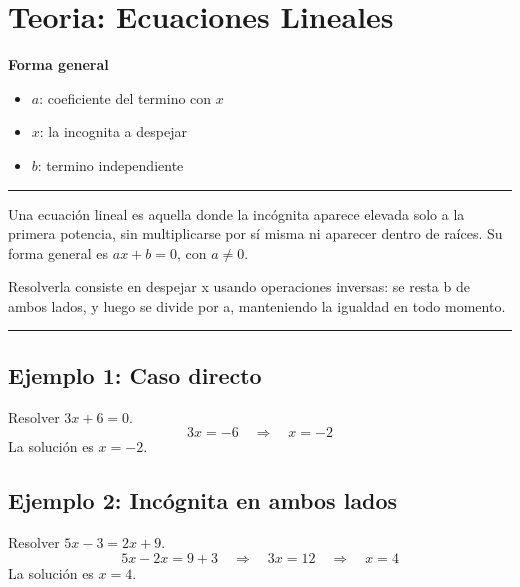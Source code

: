 \documentclass{article}
\begin{document}
\large

\section*{Teoria: Ecuaciones Lineales}

\vspace{3\baselineskip}
\begin{center}
\textbf{Forma general}

\vspace{0.8cm}
\end{center}
\vspace{0.6cm}
\begin{itemize}
\item {\Large \(a\)}: coeficiente del termino con \(x\)
\item {\Large \(x\)}: la incognita a despejar
\item {\Large \(b\)}: termino independiente
\end{itemize}
\vspace{2\baselineskip}

\hrule
\vspace{0.4cm}
Una ecuación lineal es aquella donde la incógnita aparece elevada solo a la
primera potencia, sin multiplicarse por sí misma ni aparecer dentro de raíces.
Su forma general es \(ax + b = 0\), con \(a \neq 0\).

Resolverla consiste en despejar x usando operaciones inversas: se resta b
de ambos lados, y luego se divide por a, manteniendo la igualdad en todo momento.
\vspace{0.4cm}
\hrule
\vspace{1cm}

\bigskip
{}
\subsection*{Ejemplo 1: Caso directo}
\vspace{0.4cm}
Resolver \(3x + 6 = 0\).
\vspace{0.6cm}
{\large \[ 3x = -6 \quad \Rightarrow \quad x = -2 \] }
\vspace{0.6cm}
La solución es \(x = -2\).

\bigskip
{}
\subsection*{Ejemplo 2: Incógnita en ambos lados}
\vspace{0.4cm}
Resolver \(5x - 3 = 2x + 9\).
\vspace{0.6cm}
{\large \[ 5x - 2x = 9 + 3 \quad \Rightarrow \quad 3x = 12 \quad \Rightarrow \quad x = 4 \] }
\vspace{0.6cm}
La solución es \(x = 4\).
\end{document}
